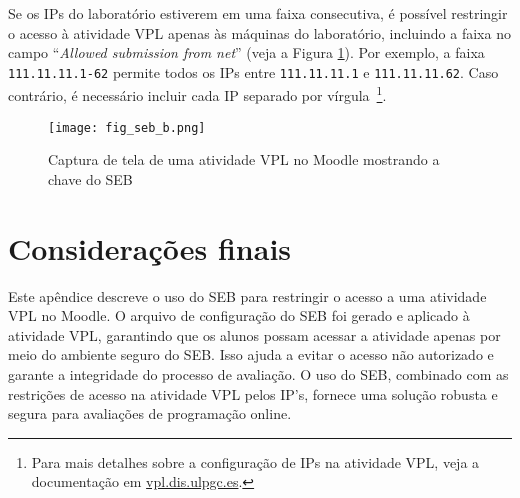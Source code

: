 Se os IPs do laboratório estiverem em uma faixa consecutiva, é possível restringir o acesso à atividade VPL apenas às máquinas do laboratório, incluindo a faixa no campo ``\textit{Allowed submission from net}'' (veja a Figura \ref{fig:fig_seb_b}). Por exemplo, a faixa \verb|111.11.11.1-62| permite todos os IPs entre \verb|111.11.11.1| e \verb|111.11.11.62|. Caso contrário, é necessário incluir cada IP separado por vírgula~\footnote{Para mais detalhes sobre a configuração de IPs na atividade VPL, veja a documentação em \href{https://vpl.dis.ulpgc.es}{vpl.dis.ulpgc.es}.}.

\begin{figure}[!ht]
\centering
\texttt{[image: fig\_seb\_b.png]}
\caption{Captura de tela de uma atividade VPL no Moodle mostrando a chave do SEB}
\label{fig:fig_seb_b}
\end{figure}


\section{Considerações finais}

Este apêndice descreve o uso do SEB para restringir o acesso a uma atividade VPL no Moodle. O arquivo de configuração do SEB foi gerado e aplicado à atividade VPL, garantindo que os alunos possam acessar a atividade apenas por meio do ambiente seguro do SEB. Isso ajuda a evitar o acesso não autorizado e garante a integridade do processo de avaliação. O uso do SEB, combinado com as restrições de acesso na atividade VPL pelos IP's, fornece uma solução robusta e segura para avaliações de programação online.

